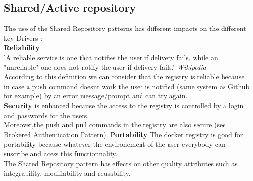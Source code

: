 \subsection{Shared/Active repository} 
The use of the Shared Repository patterns has different impacts on the different key Drivers : \\ 
\textbf{Reliability} \\
'A reliable service is one that notifies the user if delivery fails, while an "unreliable" one does not notify the user if delivery fails.'  \textit{Wikipedia} \\

According to this definition we can consider that the registry is reliable because in case a push command doesnt work the user is notified (same system as Github for example) by an error message/prompt and can try again. \\

\textbf{Security} is enhanced because the access to the registry is controlled by a login and passwords for the users. \\
Moreover,the push and pull commands in the registry are also secure (see Brokered Authentication Pattern).
\textbf{Portability} The docker registry is good for portability because whatever the environement of the user everybody can suscribe and acess this functionnality.\\

The Shared Repository pattern has effects on other quality attributes such as integrability, modifiability and reusability. 

